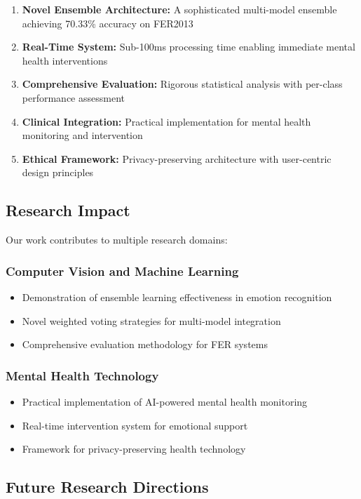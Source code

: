\documentclass[conference]{IEEEtran}
\begin{document}
\begin{enumerate}
    \item \textbf{Novel Ensemble Architecture:} A sophisticated multi-model ensemble achieving 70.33\% accuracy on FER2013
    \item \textbf{Real-Time System:} Sub-100ms processing time enabling immediate mental health interventions
    \item \textbf{Comprehensive Evaluation:} Rigorous statistical analysis with per-class performance assessment
    \item \textbf{Clinical Integration:} Practical implementation for mental health monitoring and intervention
    \item \textbf{Ethical Framework:} Privacy-preserving architecture with user-centric design principles
\end{enumerate}

\subsection{Research Impact}
Our work contributes to multiple research domains:

\subsubsection{Computer Vision and Machine Learning}
\begin{itemize}
    \item Demonstration of ensemble learning effectiveness in emotion recognition
    \item Novel weighted voting strategies for multi-model integration
    \item Comprehensive evaluation methodology for FER systems
\end{itemize}

\subsubsection{Mental Health Technology}
\begin{itemize}
    \item Practical implementation of AI-powered mental health monitoring
    \item Real-time intervention system for emotional support
    \item Framework for privacy-preserving health technology
\end{itemize}

\subsection{Future Research Directions}
\end{document}
